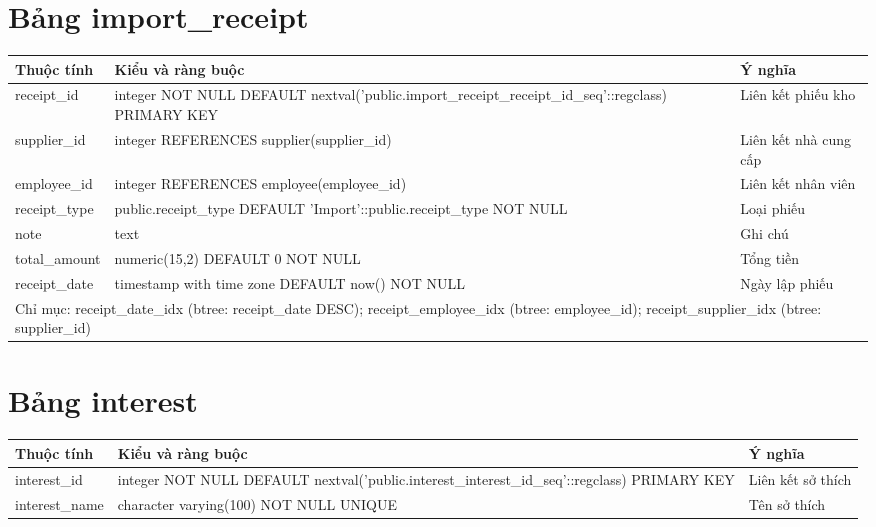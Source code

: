 \section{Bảng import\_receipt}
\begin{longtable}{|p{}|p{}|p{}|}\hline
\textbf{Thuộc tính}&\textbf{Kiểu và ràng buộc}&\textbf{Ý nghĩa}\\\hline\endhead
receipt\_id & integer NOT NULL DEFAULT nextval('public.import\_receipt\_receipt\_id\_seq'::regclass) PRIMARY KEY & Liên kết phiếu kho\\\hline
supplier\_id & integer REFERENCES supplier(supplier\_id) & Liên kết nhà cung cấp\\\hline
employee\_id & integer REFERENCES employee(employee\_id) & Liên kết nhân viên\\\hline
receipt\_type & public.receipt\_type DEFAULT 'Import'::public.receipt\_type NOT NULL & Loại phiếu\\\hline
note & text & Ghi chú\\\hline
total\_amount & numeric(15,2) DEFAULT 0 NOT NULL & Tổng tiền\\\hline
receipt\_date & timestamp with time zone DEFAULT now() NOT NULL & Ngày lập phiếu\\\hline
\multicolumn{3}{|p{0.93\textwidth}|}{Chỉ mục: receipt\_date\_idx (btree: receipt\_date DESC); receipt\_employee\_idx (btree: employee\_id); receipt\_supplier\_idx (btree: supplier\_id)}\\\hline
\end{longtable}
\normalsize
\section{Bảng interest}
\begin{longtable}{|p{}|p{}|p{}|}\hline
\textbf{Thuộc tính}&\textbf{Kiểu và ràng buộc}&\textbf{Ý nghĩa}\\\hline\endhead
interest\_id & integer NOT NULL DEFAULT nextval('public.interest\_interest\_id\_seq'::regclass) PRIMARY KEY & Liên kết sở thích\\\hline
interest\_name & character varying(100) NOT NULL UNIQUE & Tên sở thích\\\hline
\end{longtable}
\normalsize
